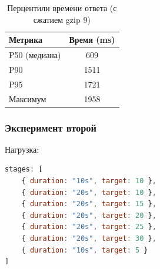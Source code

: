 \documentclass[12pt]{article}
\begin{document}
\begin{table}[H]
    \centering
    \caption{Перцентили времени ответа (с сжатием gzip 9)}
    \begin{tabular}{lS[table-format=4.5]}
        \toprule
        \textbf{Метрика} & \textbf{Время (\si{\milli\second})} \\
        \midrule
        P50 (медиана)    & 609                                 \\
        P90              & 1511                                \\
        P95              & 1721                                \\
        Максимум         & 1958                                \\
        \bottomrule
    \end{tabular}
\end{table}

\subsubsection{Эксперимент второй}

Нагрузка:
\begin{lstlisting}[language=JavaScript]
stages: [
    { duration: "10s", target: 10 },
    { duration: "20s", target: 10 },
    { duration: "20s", target: 15 },
    { duration: "20s", target: 20 },
    { duration: "20s", target: 25 },
    { duration: "20s", target: 30 },
    { duration: "10s", target: 5 }
]
\end{lstlisting}
\end{document}
